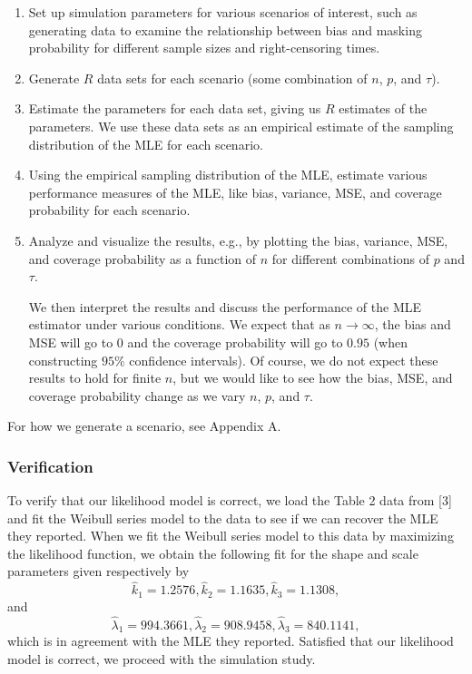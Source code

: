 \documentclass[
]{article}
\begin{document}
\begin{enumerate}
\def\labelenumi{\arabic{enumi}.}
\item
  Set up simulation parameters for various scenarios of interest, such
  as generating data to examine the relationship between bias and
  masking probability for different sample sizes and right-censoring
  times.
\item
  Generate \(R\) data sets for each scenario (some combination of \(n\),
  \(p\), and \(\tau\)).
\item
  Estimate the parameters for each data set, giving us \(R\) estimates
  of the parameters. We use these data sets as an empirical estimate of
  the sampling distribution of the MLE for each scenario.
\item
  Using the empirical sampling distribution of the MLE, estimate various
  performance measures of the MLE, like bias, variance, MSE, and
  coverage probability for each scenario.
\item
  Analyze and visualize the results, e.g., by plotting the bias,
  variance, MSE, and coverage probability as a function of \(n\) for
  different combinations of \(p\) and \(\tau\).

  We then interpret the results and discuss the performance of the MLE
  estimator under various conditions. We expect that as
  \(n \to \infty\), the bias and MSE will go to \(0\) and the coverage
  probability will go to \(0.95\) (when constructing \(95\%\) confidence
  intervals). Of course, we do not expect these results to hold for
  finite \(n\), but we would like to see how the bias, MSE, and coverage
  probability change as we vary \(n\), \(p\), and \(\tau\).
\end{enumerate}

For how we generate a scenario, see Appendix A.

\hypertarget{verification}{%
\subsubsection{Verification}\label{verification}}

To verify that our likelihood model is correct, we load the Table 2 data
from {[}3{]} and fit the Weibull series model to the data to see if we
can recover the MLE they reported. When we fit the Weibull series model
to this data by maximizing the likelihood function, we obtain the
following fit for the shape and scale parameters given respectively by
\[
    \hat{k}_1 = 1.2576,
    \hat{k}_2 = 1.1635,
    \hat{k}_3 = 1.1308,
\] and \[
    \hat{\lambda}_1 = 994.3661,
    \hat{\lambda}_2 = 908.9458,
    \hat{\lambda}_3 = 840.1141,
\] which is in agreement with the MLE they reported. Satisfied that our
likelihood model is correct, we proceed with the simulation study.
\end{document}
